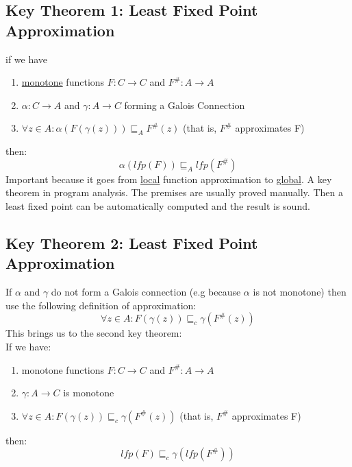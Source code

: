 \subsection{Key Theorem 1: Least Fixed Point Approximation}
if we have 
\begin{enumerate}
\item \underline{monotone} functions $F: C \to C$ and $F^{\#}:A \to A$
\item $\alpha:C \to A$ and $\gamma: A \to C$ forming a Galois Connection
\item $\forall z \in A:\alpha(F(\gamma(z))) \sqsubseteq_A F^{\#}(z)$ (that is, $F^{\#}$ approximates F)
\end{enumerate}
then:
\begin{equation}
\label{eq:least_fixed_approx}
\alpha(lfp(F)) \sqsubseteq_A lfp(F^{\#})
\end{equation}
Important because it goes from \underline{local} function approximation to \underline{global}. A key theorem in program analysis. The premises are usually proved manually. Then a least fixed point can be automatically computed and the result is sound.	
\subsection{Key Theorem 2: Least Fixed Point Approximation}
If $\alpha$ and $\gamma$ do not form a Galois connection (e.g because $\alpha$ is not monotone) then use the following definition of approximation:
\begin{equation}
\forall z \in A: F(\gamma(z)) \sqsubseteq_c \gamma(F^{\#}(z))
\end{equation}
This brings us to the second key theorem:\\
If we have:
\begin{enumerate}
\item monotone functions $F:C \to C$ and $F^{\#}:A \to A$
\item $\gamma:A \to C$ is monotone
\item $\forall z \in A: F(\gamma(z)) \sqsubseteq_c \gamma(F^{\#}(z))$ (that is, $F^{\#}$ approximates F)
\end{enumerate}
then:
\begin{equation}
lfp(F) \sqsubseteq_c \gamma(lfp(F^{\#}))
\end{equation}
